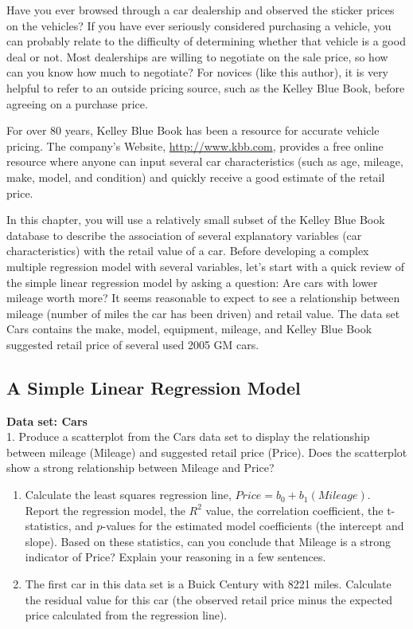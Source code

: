 \documentclass[
]{report}
\theoremstyle{definition}
\theoremstyle{definition}
\theoremstyle{definition}
\theoremstyle{definition}
\theoremstyle{remark}
\begin{document}
Have you ever browsed through a car dealership and observed the sticker prices on the vehicles? If you have ever seriously considered purchasing a vehicle, you can probably relate to the difficulty of determining whether that vehicle is a good deal or not. Most dealerships are willing to negotiate on the sale price, so how can you know how much to negotiate? For novices (like this author), it is very helpful to refer to an outside
pricing source, such as the Kelley Blue Book, before agreeing on a purchase price.

For over 80 years, Kelley Blue Book has been a resource for accurate vehicle pricing. The company's Website, \url{http://www.kbb.com}, provides a free online resource where anyone can input several car characteristics (such as age, mileage, make, model, and condition) and quickly receive a good estimate of the retail price.

In this chapter, you will use a relatively small subset of the Kelley Blue Book database to describe the association of several explanatory variables (car characteristics) with the retail value of a car. Before developing a complex multiple regression model with several variables, let's start with a quick review of the simple linear regression model by asking a question: Are cars with lower mileage worth more? It seems reasonable
to expect to see a relationship between mileage (number of miles the car has been driven) and retail value. The data set Cars contains the make, model, equipment, mileage, and Kelley Blue Book suggested retail price of several used 2005 GM cars.

\hypertarget{a-simple-linear-regression-model}{%
\subsection{A Simple Linear Regression Model}\label{a-simple-linear-regression-model}}

\textbf{Data set: Cars}\\
1. Produce a scatterplot from the Cars data set to display the relationship between mileage (Mileage) and suggested retail price (Price). Does the scatterplot show a strong relationship between Mileage and Price?

\begin{enumerate}
\def\labelenumi{\arabic{enumi}.}
\setcounter{enumi}{1}
\item
  Calculate the least squares regression line, \(Price = b_0 + b_1(Mileage)\). Report the regression model, the \(R^2\) value, the correlation coefficient, the t-statistics, and \(p\)-values for the estimated model coefficients (the intercept and slope). Based on these statistics, can you conclude that Mileage is a strong indicator of Price? Explain your reasoning in a few sentences.
\item
  The first car in this data set is a Buick Century with 8221 miles. Calculate the residual value for this car (the observed retail price minus the expected price calculated from the regression line).
\end{enumerate}
\end{document}
